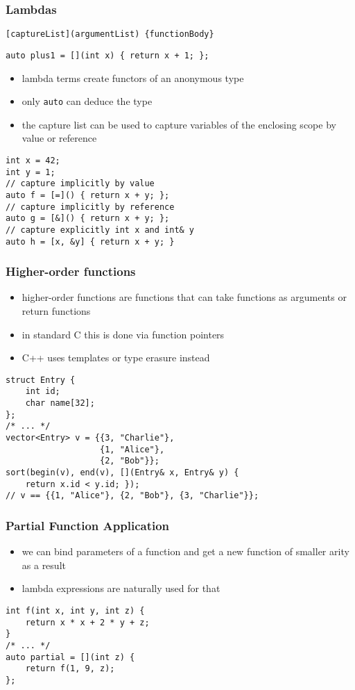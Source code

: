 \begin{frame}[fragile]
    \frametitle{Lambdas}
    \begin{lstlisting}[numbers=none]
[captureList](argumentList) {functionBody}
    \end{lstlisting}
    \begin{lstlisting}[numbers=none]
auto plus1 = [](int x) { return x + 1; };
    \end{lstlisting}
    \begin{itemize}
        \item lambda terms create functors of an anonymous type
        \item only \lstinline{auto} can deduce the type
        \item the capture list can be used to capture variables of the enclosing scope by value or reference
    \end{itemize}
    \begin{lstlisting}[numbers=none]
int x = 42;
int y = 1;
// capture implicitly by value
auto f = [=]() { return x + y; };
// capture implicitly by reference
auto g = [&]() { return x + y; }; 
// capture explicitly int x and int& y
auto h = [x, &y] { return x + y; }
    \end{lstlisting}
\end{frame}
\begin{frame}[fragile]
    \frametitle{Higher-order functions}
    \begin{itemize}
        \item higher-order functions are functions that can take functions as arguments or return functions
        \item in standard C this is done via function pointers
        \item C++ uses templates or type erasure instead
    \end{itemize}
    \begin{lstlisting}[numbers=none]
struct Entry {
    int id;
    char name[32];
};
/* ... */
vector<Entry> v = {{3, "Charlie"}, 
                   {1, "Alice"},
                   {2, "Bob"}};
sort(begin(v), end(v), [](Entry& x, Entry& y) {
    return x.id < y.id; });
// v == {{1, "Alice"}, {2, "Bob"}, {3, "Charlie"}};
    \end{lstlisting}
\end{frame}

\begin{frame}[fragile]
    \frametitle{Partial Function Application}
    \begin{itemize}
        \item we can bind parameters of a function and get a new function of smaller arity as a result
        \item lambda expressions are naturally used for that
    \end{itemize}
    \begin{lstlisting}[numbers=none]
int f(int x, int y, int z) {
    return x * x + 2 * y + z;
}
/* ... */
auto partial = [](int z) {
    return f(1, 9, z);
};
    \end{lstlisting}
\end{frame}


